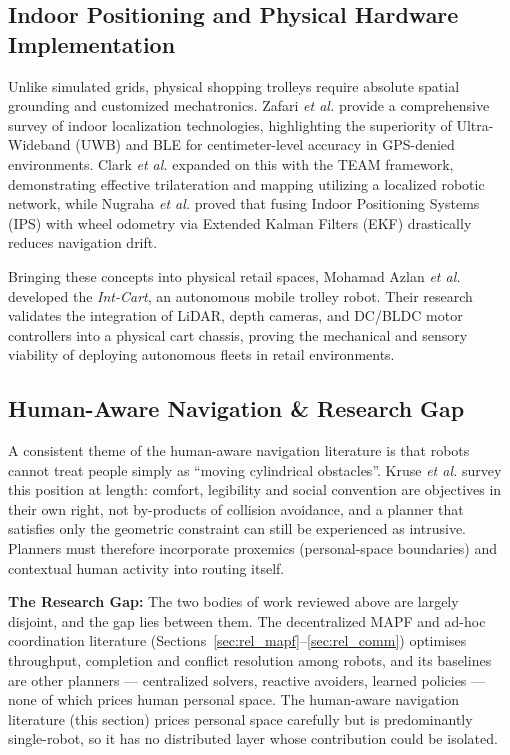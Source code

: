 \documentclass[journal]{IEEEtran}
\begin{document}
\subsection{Indoor Positioning and Physical Hardware Implementation}
Unlike simulated grids, physical shopping trolleys require absolute spatial grounding and customized mechatronics. Zafari \textit{et al.} \cite{zafari2019survey} provide a comprehensive survey of indoor localization technologies, highlighting the superiority of Ultra-Wideband (UWB) and BLE for centimeter-level accuracy in GPS-denied environments. Clark \textit{et al.} \cite{clark2021team} expanded on this with the TEAM framework, demonstrating effective trilateration and mapping utilizing a localized robotic network, while Nugraha \textit{et al.} \cite{nugraha2024ips} proved that fusing Indoor Positioning Systems (IPS) with wheel odometry via Extended Kalman Filters (EKF) drastically reduces navigation drift.

Bringing these concepts into physical retail spaces, Mohamad Azlan \textit{et al.} \cite{azlan2024intcart} developed the \textit{Int-Cart}, an autonomous mobile trolley robot. Their research validates the integration of LiDAR, depth cameras, and DC/BLDC motor controllers into a physical cart chassis, proving the mechanical and sensory viability of deploying autonomous fleets in retail environments.

\subsection{Human-Aware Navigation \& Research Gap}
A consistent theme of the human-aware navigation literature is that robots cannot treat people simply as ``moving cylindrical obstacles''. Kruse \textit{et al.} \cite{kruse2013human} survey this position at length: comfort, legibility and social convention are objectives in their own right, not by-products of collision avoidance, and a planner that satisfies only the geometric constraint can still be experienced as intrusive. Planners must therefore incorporate proxemics (personal-space boundaries) and contextual human activity into routing itself. 

\textbf{The Research Gap:} The two bodies of work reviewed above are largely disjoint, and the gap lies between them. The decentralized MAPF and ad-hoc coordination literature (Sections~\ref{sec:rel_mapf}--\ref{sec:rel_comm}) optimises throughput, completion and conflict resolution among robots, and its baselines are other planners --- centralized solvers, reactive avoiders, learned policies --- none of which prices human personal space. The human-aware navigation literature (this section) prices personal space carefully but is predominantly single-robot, so it has no distributed layer whose contribution could be isolated.
\end{document}
